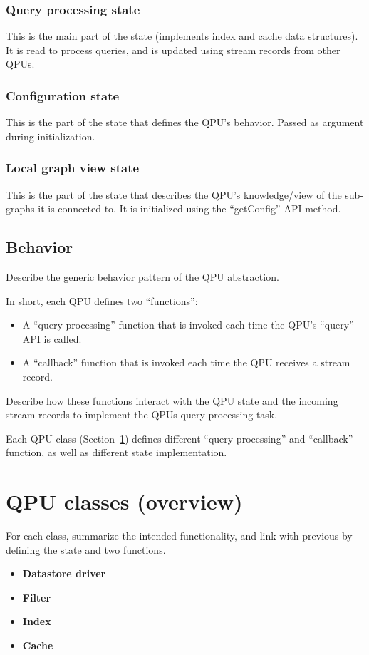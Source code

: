\subsubsection{Query processing state}
This is the main part of the state (implements index and cache data structures).
It is read to process queries, and is updated using stream records from other
QPUs.
\subsubsection{Configuration state}
This is the part of the state that defines the QPU's behavior.
Passed as argument during initialization.

\subsubsection{Local graph view state}
This is the part of the state that describes the QPU's knowledge/view of the
sub-graphs it is connected to.
It is initialized using the ``getConfig'' API method.

\subsection{Behavior}
Describe the generic behavior pattern of the QPU abstraction.

In short, each QPU defines two ``functions'':
\begin{itemize}
  \item A ``query processing'' function that is invoked each time the QPU's
  ``query'' API is called.
  \item A ``callback'' function that is invoked each time the QPU receives
  a stream record.
\end{itemize}
Describe how these functions interact with the QPU state and the incoming stream
records to implement the QPUs query processing task.

Each QPU class (Section~\ref{sec:qpu_classes}) defines different ``query processing''
and ``callback'' function, as well as different state implementation.

\section{QPU classes (overview)}
\label{sec:qpu_classes}
For each class, summarize the intended functionality, and link with previous
by defining the state and two functions.


\begin{itemize}
  \item \textbf{Datastore driver}
  \item \textbf{Filter}
  \item \textbf{Index}
  \item \textbf{Cache}
\end{itemize}

